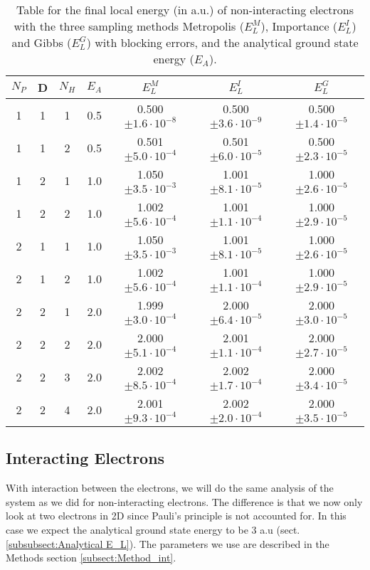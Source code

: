 \documentclass[12pt,a4paper,english]{article}
\begin{document}
\begin{table}[htbp!]
	\centering
	\begin{tabular}{ |c|c|c|c|c|c|c| }
		\hline \rule{0pt}{13pt}
		$N_P$ & D & $N_H$ & $E_A$ & $E_L^M$ & $E_L^I$ & $E_L^G$ \\
		\hline \rule{0pt}{13pt}%
		1 & 1 & 1 & 0.5 & 0.500$\pm1.6\cdot10^{-8}$ & 0.500$\pm3.6\cdot10^{-9}$ & 0.500$\pm1.4\cdot10^{-5}$ \\
		1 & 1 & 2 & 0.5 & 0.501$\pm5.0\cdot10^{-4}$ & 0.501$\pm6.0\cdot10^{-5}$ & 0.500$\pm2.3\cdot10^{-5}$ \\
		\hline \rule{0pt}{13pt}%
		1 & 2 & 1 & 1.0 & 1.050$\pm3.5\cdot10^{-3}$ & 1.001$\pm8.1\cdot10^{-5}$ & 1.000$\pm2.6\cdot10^{-5}$ \\
		1 & 2 & 2 & 1.0 & 1.002$\pm5.6\cdot10^{-4}$ & 1.001$\pm1.1\cdot10^{-4}$ & 1.000$\pm2.9\cdot10^{-5}$ \\
		\hline \rule{0pt}{13pt}%
		2 & 1 & 1 & 1.0 & 1.050$\pm3.5\cdot10^{-3}$ & 1.001$\pm8.1\cdot10^{-5}$ & 1.000$\pm2.6\cdot10^{-5}$ \\
		2 & 1 & 2 & 1.0 & 1.002$\pm5.6\cdot10^{-4}$ & 1.001$\pm1.1\cdot10^{-4}$ & 1.000$\pm2.9\cdot10^{-5}$ \\
		\hline \rule{0pt}{13pt}%
		2 & 2 & 1 & 2.0 & 1.999$\pm3.0\cdot10^{-4}$ & 2.000$\pm6.4\cdot10^{-5}$ & 2.000$\pm3.0\cdot10^{-5}$ \\
		2 & 2 & 2 & 2.0 & 2.000$\pm5.1\cdot10^{-4}$ & 2.001$\pm1.1\cdot10^{-4}$ & 2.000$\pm2.7\cdot10^{-5}$ \\
		2 & 2 & 3 & 2.0 & 2.002$\pm8.5\cdot10^{-4}$ & 2.002$\pm1.7\cdot10^{-4}$ & 2.000$\pm3.4\cdot10^{-5}$ \\
		2 & 2 & 4 & 2.0 & 2.001$\pm9.3\cdot10^{-4}$ & 2.002$\pm2.0\cdot10^{-4}$ & 2.000$\pm3.5\cdot10^{-5}$ \\
		\hline
	\end{tabular}	
	\caption{Table for the final local energy (in a.u.) of non-interacting electrons with the three sampling methods Metropolis ($E_L^M$), Importance ($E_L^I$) and Gibbs ($E_L^G$) with blocking errors, and the analytical ground state energy ($E_A$). \label{tab:Nonint_energies}}
\end{table}

\subsection{Interacting Electrons}
\label{subsect:Results_int}
With interaction between the electrons, we will do the same analysis of the system as we did for non-interacting electrons. The difference is that we now only look at two electrons in 2D since Pauli's principle is not accounted for. In this case we expect the analytical ground state energy to be 3 a.u (sect. \ref{subsubsect:Analytical E_L}). The parameters we use are described in the Methods section \ref{subsect:Method_int}.
\end{document}
